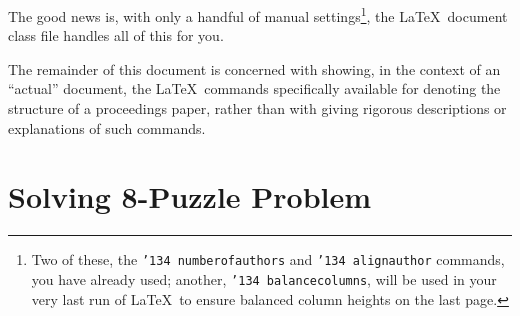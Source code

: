 \documentclass{sig-alternate-05-2015}
\begin{document}
The good news is, with only a handful of manual
settings\footnote{Two of these, the {\texttt{\char'134 numberofauthors}}
and {\texttt{\char'134 alignauthor}} commands, you have
already used; another, {\texttt{\char'134 balancecolumns}}, will
be used in your very last run of \LaTeX\ to ensure
balanced column heights on the last page.}, the \LaTeX\ document
class file handles all of this for you.

The remainder of this document is concerned with showing, in
the context of an ``actual'' document, the \LaTeX\ commands
specifically available for denoting the structure of a
proceedings paper, rather than with giving rigorous descriptions
or explanations of such commands.

\section{Solving 8-Puzzle Problem}
\end{document}
